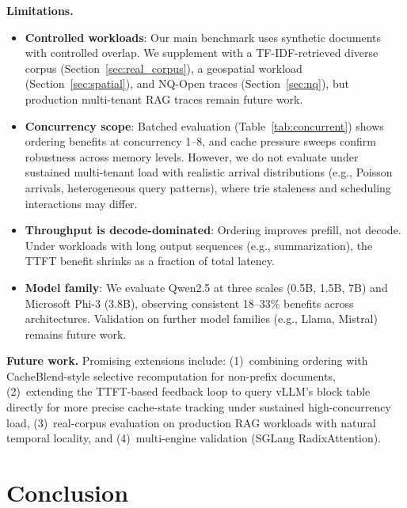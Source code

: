 \documentclass{article}
\begin{document}
\textbf{Limitations.}
\begin{itemize}
\item \textbf{Controlled workloads}: Our main benchmark uses synthetic documents with controlled overlap. We supplement with a TF-IDF-retrieved diverse corpus (Section~\ref{sec:real_corpus}), a geospatial workload (Section~\ref{sec:spatial}), and NQ-Open traces (Section~\ref{sec:nq}), but production multi-tenant RAG traces remain future work.
\item \textbf{Concurrency scope}: Batched evaluation (Table~\ref{tab:concurrent}) shows ordering benefits at concurrency 1--8, and cache pressure sweeps confirm robustness across memory levels. However, we do not evaluate under sustained multi-tenant load with realistic arrival distributions (e.g., Poisson arrivals, heterogeneous query patterns), where trie staleness and scheduling interactions may differ.
\item \textbf{Throughput is decode-dominated}: Ordering improves prefill, not decode. Under workloads with long output sequences (e.g., summarization), the TTFT benefit shrinks as a fraction of total latency.
\item \textbf{Model family}: We evaluate Qwen2.5 at three scales (0.5B, 1.5B, 7B) and Microsoft Phi-3 (3.8B), observing consistent 18--33\% benefits across architectures. Validation on further model families (e.g., Llama, Mistral) remains future work.
\end{itemize}

\textbf{Future work.} Promising extensions include: (1)~combining ordering with CacheBlend-style selective recomputation for non-prefix documents, (2)~extending the TTFT-based feedback loop to query vLLM's block table directly for more precise cache-state tracking under sustained high-concurrency load, (3)~real-corpus evaluation on production RAG workloads with natural temporal locality, and (4)~multi-engine validation (SGLang RadixAttention).

\section{Conclusion}
\label{sec:conclusion}
\end{document}
